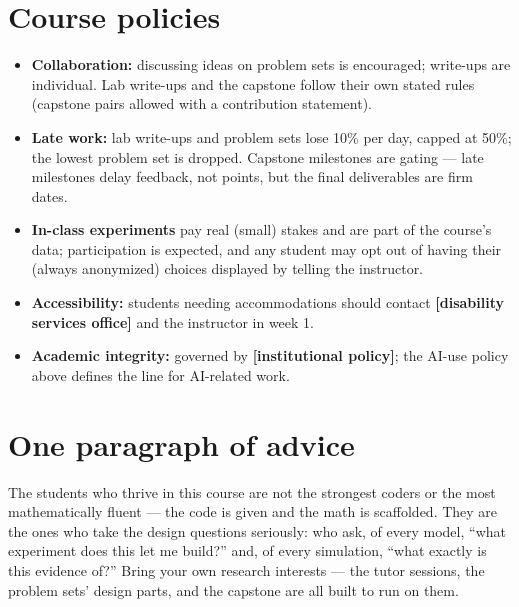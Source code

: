 \documentclass[11pt]{article}
\begin{document}
\section*{Course policies}
\begin{itemize}[nosep]
  \item \textbf{Collaboration:} discussing ideas on problem sets is
        encouraged; write-ups are individual. Lab write-ups and the
        capstone follow their own stated rules (capstone pairs
        allowed with a contribution statement).
  \item \textbf{Late work:} lab write-ups and problem sets lose 10\%
        per day, capped at 50\%; the lowest problem set is dropped.
        Capstone milestones are gating --- late milestones delay
        feedback, not points, but the final deliverables are firm
        dates.
  \item \textbf{In-class experiments} pay real (small) stakes and are
        part of the course's data; participation is expected, and any
        student may opt out of having their (always anonymized)
        choices displayed by telling the instructor.
  \item \textbf{Accessibility:} students needing accommodations should
        contact \textbf{[disability services office]} and the
        instructor in week 1.
  \item \textbf{Academic integrity:} governed by \textbf{[institutional
        policy]}; the AI-use policy above defines the line for
        AI-related work.
\end{itemize}

\section*{One paragraph of advice}
The students who thrive in this course are not the strongest coders or
the most mathematically fluent --- the code is given and the math is
scaffolded. They are the ones who take the design questions seriously:
who ask, of every model, ``what experiment does this let me build?''
and, of every simulation, ``what exactly is this evidence of?'' Bring
your own research interests --- the tutor sessions, the problem sets'
design parts, and the capstone are all built to run on them.
\end{document}
